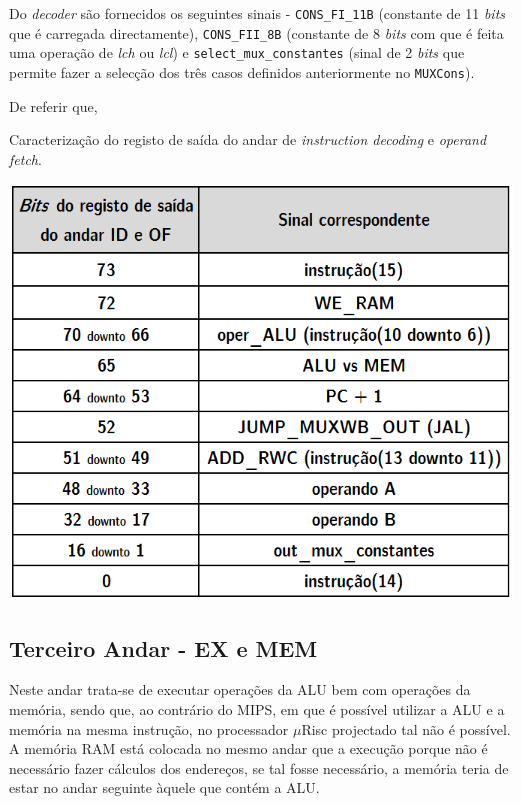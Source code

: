 \documentclass[11pt]{article}
\numberwithin{equation}{section}
\begin{document}
Do \textit{decoder} são fornecidos os seguintes sinais - \texttt{CONS\_FI\_11B} (constante de 11 \textit{bits} que é carregada directamente), \texttt{CONS\_FII\_8B} (constante de 8 \textit{bits} com que é feita uma operação de \textit{lch} ou \textit{lcl}) e \texttt{select\_mux\_constantes}  (sinal de 2 \textit{bits} que permite fazer a selecção dos três casos definidos anteriormente no \texttt{MUXCons}).

De referir que, 

\begin{table}[h]
	\centering
	\caption{Caracterização do registo de saída do andar de \textit{instruction decoding} e \textit{operand fetch}.}
	\vspace{-2mm}
 	\includegraphics[keepaspectratio=true, scale=0.45]{tabelas/regIDOF}
\end{table}

\subsection{Terceiro Andar - EX e MEM}

Neste andar trata-se de executar operações da ALU bem com operações da memória, sendo que, ao contrário do MIPS, em que é possível utilizar a ALU e a memória na mesma instrução, no processador $\mu$Risc projectado tal não é possível. A memória RAM está colocada no mesmo andar que a execução porque não é necessário fazer cálculos dos endereços, se tal fosse necessário, a memória teria de estar no andar seguinte àquele que contém a ALU. 
\end{document}
